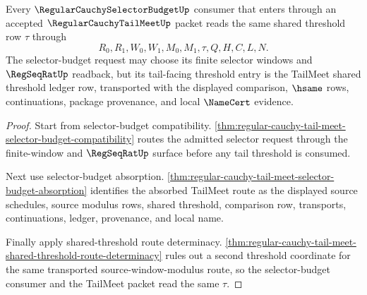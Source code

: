 \begin{theorem}
\label{thm:regular-cauchy-tail-meet-selector-budget-shared-entry}
Every $\RegularCauchySelectorBudgetUp$ consumer that enters through an accepted $\RegularCauchyTailMeetUp$ packet reads the same shared threshold row $\tau$ through
$$
R_0,R_1,W_0,W_1,M_0,M_1,\tau,Q,H,C,L,N.
$$
The selector-budget request may choose its finite selector windows and $\RegSeqRatUp$ readback, but its tail-facing threshold entry is the TailMeet shared threshold ledger row, transported with the displayed comparison, $\hsame$ rows, continuations, package provenance, and local $\NameCert$ evidence.
\end{theorem}
\begin{proof}
Start from selector-budget compatibility. \autoref{thm:regular-cauchy-tail-meet-selector-budget-compatibility} routes the admitted selector request through the finite-window and $\RegSeqRatUp$ surface before any tail threshold is consumed.

Next use selector-budget absorption. \autoref{thm:regular-cauchy-tail-meet-selector-budget-absorption} identifies the absorbed TailMeet route as the displayed source schedules, source modulus rows, shared threshold, comparison row, transports, continuations, ledger, provenance, and local name.

Finally apply shared-threshold route determinacy. \autoref{thm:regular-cauchy-tail-meet-shared-threshold-route-determinacy} rules out a second threshold coordinate for the same transported source-window-modulus route, so the selector-budget consumer and the TailMeet packet read the same $\tau$.
\end{proof}

